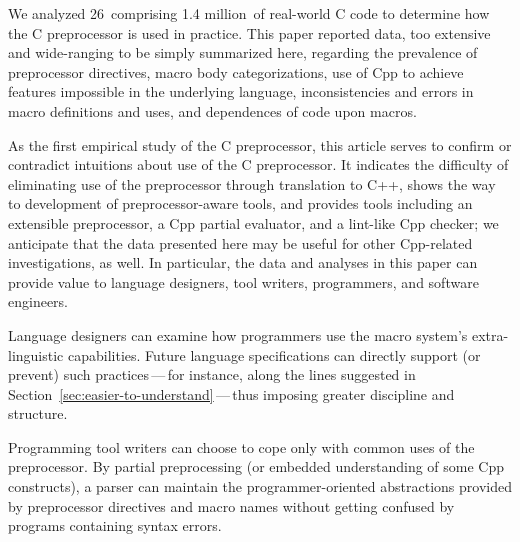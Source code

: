 \documentclass[10pt]{article}
\def\numpackages{26}
\def\numlines{1.4 million}      %
\begin{document}



We analyzed \numpackages\ comprising \numlines\ of real-world C code to
determine how the C preprocessor is used in practice.  This paper reported
data, too extensive and wide-ranging to be simply summarized here,
regarding the prevalence of preprocessor directives, macro body
categorizations, use of Cpp to achieve features impossible in the
underlying language, inconsistencies and errors in macro definitions and
uses, and dependences of code upon macros.

As the first empirical study of the C preprocessor, this article serves to
confirm or contradict intuitions about use of the C preprocessor.  It
indicates the difficulty of eliminating use of the preprocessor through
translation to C++, shows the way to development of preprocessor-aware
tools, and provides tools including an extensible preprocessor, a Cpp
partial evaluator, and a lint-like Cpp checker; we anticipate that the data
presented here may be useful for other Cpp-related investigations, as well.
In particular,
the data and analyses in this paper can provide value to language
designers, tool writers, programmers, and software engineers.

Language designers can examine how programmers use the macro system's
extra-linguistic capabilities.  Future language specifications can
directly support (or prevent) such practices\,---\,for instance, along the
lines suggested in Section~\ref{sec:easier-to-understand}\,---\,thus
imposing greater discipline and structure.  


Programming tool writers can choose to cope only with common uses of
the preprocessor.  By partial preprocessing (or embedded understanding
of some Cpp constructs), a parser can maintain the programmer-oriented
abstractions provided by preprocessor directives and macro names without
getting confused by programs containing syntax errors.
\end{document}
